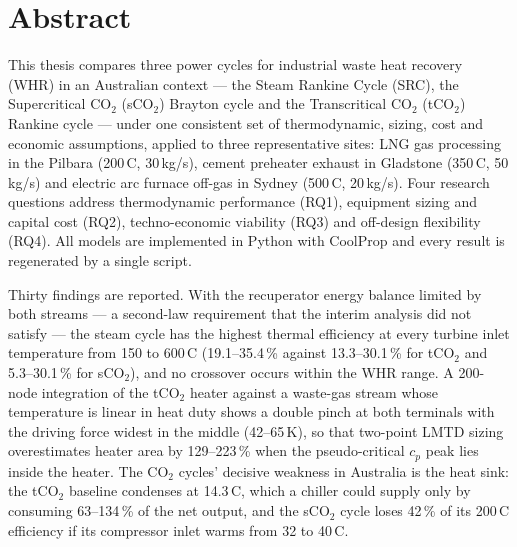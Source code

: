 \documentclass[12pt,a4paper]{report}
\begin{document}
\chapter*{Abstract}

This thesis compares three power cycles for industrial waste heat recovery
(WHR) in an Australian context --- the Steam Rankine Cycle (SRC), the
Supercritical CO$_2$ (sCO$_2$) Brayton cycle and the Transcritical CO$_2$
(tCO$_2$) Rankine cycle --- under one consistent set of thermodynamic,
sizing, cost and economic assumptions, applied to three representative
sites: LNG gas processing in the Pilbara (200\,\textdegree C, 30\,kg/s),
cement preheater exhaust in Gladstone (350\,\textdegree C, 50\,kg/s) and
electric arc furnace off-gas in Sydney (500\,\textdegree C, 20\,kg/s). Four
research questions address thermodynamic performance (RQ1), equipment sizing
and capital cost (RQ2), techno-economic viability (RQ3) and off-design
flexibility (RQ4). All models are implemented in Python with CoolProp and
every result is regenerated by a single script.

Thirty findings are reported. With the recuperator energy balance limited by
both streams --- a second-law requirement that the interim analysis did not
satisfy --- the steam cycle has the highest thermal efficiency at every
turbine inlet temperature from 150 to 600\,\textdegree C (19.1--35.4\,\%
against 13.3--30.1\,\% for tCO$_2$ and 5.3--30.1\,\% for sCO$_2$), and no
crossover occurs within the WHR range. A 200-node integration of the tCO$_2$
heater against a waste-gas stream whose temperature is linear in heat duty
shows a double pinch at both terminals with the driving force widest in the
middle (42--65\,K), so that two-point LMTD sizing overestimates heater area
by 129--223\,\% when the pseudo-critical $c_p$ peak lies inside the heater.
The CO$_2$ cycles' decisive weakness in Australia is the heat sink: the
tCO$_2$ baseline condenses at 14.3\,\textdegree C, which a chiller could
supply only by consuming 63--134\,\% of the net output, and the sCO$_2$ cycle
loses 42\,\% of its 200\,\textdegree C efficiency if its compressor inlet
warms from 32 to 40\,\textdegree C.
\end{document}
